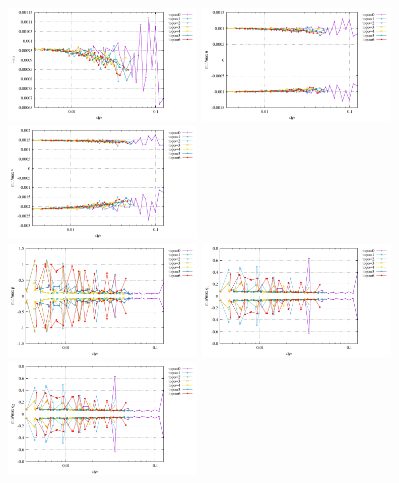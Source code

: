 \begin{center}
\includegraphics[width=5cm]{python_codes/fieldstone_78/results/vrms_exp3.pdf} 
\includegraphics[width=5cm]{python_codes/fieldstone_78/results/stats_u_exp3.pdf}
\includegraphics[width=5cm]{python_codes/fieldstone_78/results/stats_v_exp3.pdf}\\
\includegraphics[width=5cm]{python_codes/fieldstone_78/results/stats_p_exp3.pdf}
\includegraphics[width=5cm]{python_codes/fieldstone_78/results/stats_q1_exp3.pdf}
\includegraphics[width=5cm]{python_codes/fieldstone_78/results/stats_q2_exp3.pdf}
\end{center}

